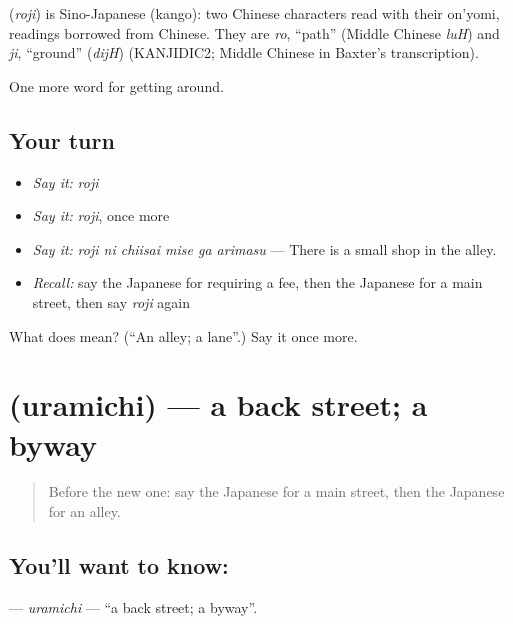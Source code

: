 \begin{cousinweb}
\textbf{} (\emph{roji}) is Sino-Japanese (kango): two Chinese characters read with their on'yomi, readings borrowed from Chinese. They are \emph{ro}, \textquotedblleft{}path\textquotedblright{} (Middle Chinese \emph{luH}) and \emph{ji}, \textquotedblleft{}ground\textquotedblright{} (\emph{dijH}) (KANJIDIC2; Middle Chinese in Baxter's transcription).
\end{cousinweb}

\begin{grammarlens}[title={What you've built}]
One more word for getting around.
\end{grammarlens}

\subsection*{Your turn}
\begin{itemize}
\raggedright
  \item \emph{Say it:} \emph{roji}
  \item \emph{Say it:} \emph{roji}, once more
  \item \emph{Say it:} \emph{roji ni chiisai mise ga arimasu} — There is a small shop in the alley.
  \item \emph{Recall:} say the Japanese for requiring a fee, then the Japanese for a main street, then say \emph{roji} again
\end{itemize}

\begin{tcolorbox}[breakable,colback=teal!4,colframe=teal!35!black,title={Before you move on}]
What does  mean? (\textquotedblleft{}An alley; a lane\textquotedblright{}.) Say it once more.
\end{tcolorbox}
\section[\texorpdfstring{\ja{うらみち} (uramichi)}{うらみち (uramichi)}]{ (uramichi) — a back street; a byway}

\label{lesson:JA-C389-uramichi}



\begin{quote}
Before the new one: say the Japanese for a main street, then the Japanese for an alley.
\end{quote}

\subsection*{You'll want to know: }
\textbf{} — \emph{uramichi} — \textquotedblleft{}a back street; a byway\textquotedblright{}.


